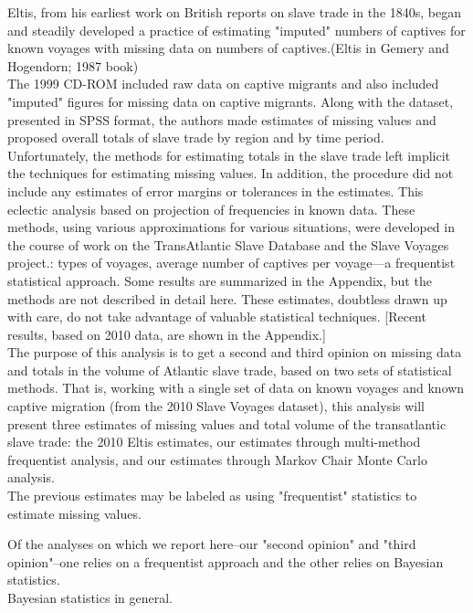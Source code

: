 \documentclass{article}
\begin{document}
Eltis, from his earliest work on British reports on slave trade in the 1840s, began and steadily developed a practice of estimating "imputed" numbers of captives for known voyages with missing data on numbers of captives.(Eltis in Gemery and Hogendorn; 1987 book)\\

The 1999 CD-ROM included raw data on captive migrants and also included "imputed" figures for missing data on captive migrants. Along with the dataset, presented in SPSS format, the authors made estimates of missing values and proposed overall totals of slave trade by region and by time period. Unfortunately, the methods for estimating totals in the slave trade left implicit the techniques for estimating missing values. In addition, the procedure did not include any estimates of error margins or tolerances in the estimates. This eclectic analysis based on projection of frequencies in known data. These methods, using various approximations for various situations, were developed in the course of work on the TransAtlantic Slave Database and the Slave Voyages project.: types of voyages, average number of captives per voyage---a frequentist statistical approach.  Some results are summarized in the Appendix, but the methods are not described in detail here. These estimates, doubtless drawn up with care, do not take advantage of valuable statistical techniques. [Recent results, based on 2010 data, are shown in the Appendix.]\\

The purpose of this analysis is to get a second and third opinion on missing data and totals in the volume of Atlantic slave trade, based on two sets of statistical methods. That is, working with a single set of data on known voyages and known captive migration (from the 2010 Slave Voyages dataset), this analysis will present three estimates of missing values and total volume of the transatlantic slave trade: the 2010 Eltis estimates, our estimates through multi-method frequentist analysis, and our estimates through Markov Chair Monte Carlo analysis.\\

The previous estimates may be labeled as using "frequentist" statistics to estimate missing values.

Of the analyses on which we report here--our "second opinion" and "third opinion"--one relies on a frequentist approach and the other relies on Bayesian statistics.\\


Bayesian statistics in general.
\end{document}
